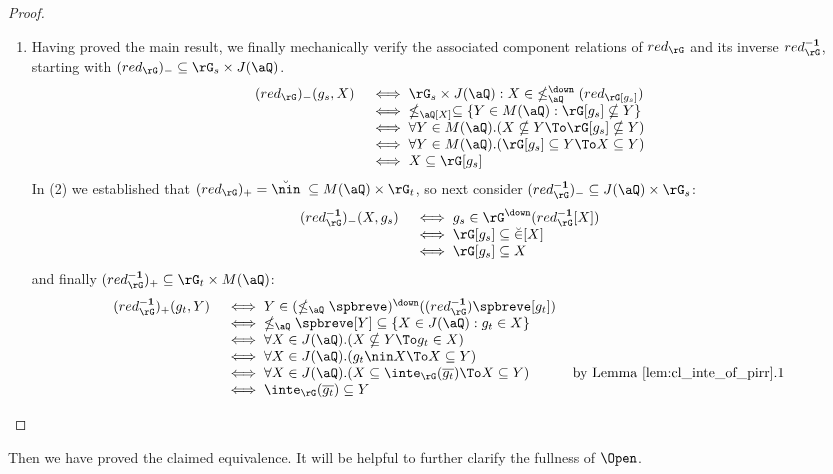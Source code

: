 \documentclass{article}
\begin{document}
\begin{proof}
\begin{enumerate}
\item
Having proved the main result, we finally mechanically verify the associated component relations of $red_\rG$ and its inverse $red_\rG^{\bf-1}$, starting with $(red_\rG)_- \subseteq \rG_s \times J(\aQ)$.
\[
\begin{tabular}{lll}
$(red_\rG)_-(g_s,X)$
&
$\iff \rG_s \times J(\aQ) : X \in\; \nleq_\aQ^\down(red_\rG[g_s])$
\\&
$\iff \;\nleq_\aQ[X] \subseteq \{ Y \in M(\aQ) : \rG[g_s] \nsubseteq Y \}$
\\&
$\iff \forall Y \in M(\aQ).(X \nsubseteq Y \To \rG[g_s] \nsubseteq Y)$
\\&
$\iff \forall Y \in M(\aQ).(\rG[g_s] \subseteq Y \To X \subseteq Y)$
\\&
$\iff X \subseteq \rG[g_s]$
\end{tabular}
\]
In (2) we established that $(red_\rG)_+ = \breve{\nin} \; \subseteq M(\aQ) \times \rG_t$, so next consider $(red_\rG^{\bf-1})_- \subseteq J(\aQ) \times \rG_s$:
\[
\begin{tabular}{lll}
$(red_\rG^{\bf-1})_- (X,g_s)$
&
$\iff g_s \in \rG^\down(red_\rG^{\bf-1}[X])$
\\&
$\iff \rG[g_s] \subseteq \breve{\in}[X]$
\\&
$\iff \rG[g_s] \subseteq X $
\end{tabular}
\]
and finally $(red_\rG^{\bf-1})_+ \subseteq \rG_t \times M(\aQ)$:
\[
\begin{tabular}{lll}
$(red_\rG^{\bf-1})_+(g_t,Y)$
&
$\iff Y \in (\nleq_\aQ\spbreve)^\down((red_\rG^{\bf-1})\spbreve[g_t])$
\\&
$\iff \;\nleq_\aQ\spbreve[Y] \subseteq \{ X \in J(\aQ) : g_t \in X \}$
\\&
$\iff \forall X \in J(\aQ).(X \nsubseteq Y \To g_t \in X )$
\\&
$\iff \forall X \in J(\aQ).(g_t \nin X \To X \subseteq Y)$
\\&
$\iff \forall X \in J(\aQ).(X \subseteq \inte_\rG(\overline{g_t}) \To X \subseteq Y)$
& by Lemma \ref{lem:cl_inte_of_pirr}.1
\\&
$\iff \inte_\rG(\overline{g_t}) \subseteq Y$
\end{tabular}
\]

\end{enumerate}
\end{proof}

Then we have proved the claimed equivalence. It will be helpful to further clarify the fullness of $\Open$.
\end{document}
